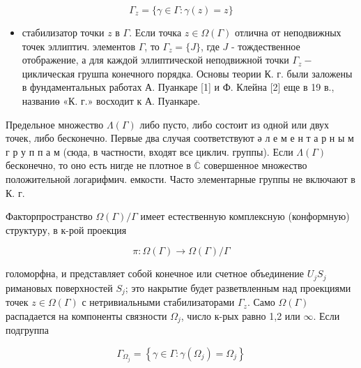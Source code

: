 \documentclass[10pt]{article}
\begin{document}
\[

\Gamma_{z}=\{\gamma \in \Gamma: \gamma(z)=z\}

\]



\begin{itemize}

  \item стабилизатор точки $z$ в $\Gamma$. Если точка $z \in \Omega(\Gamma)$ отлична от неподвижных точек эллиптич. элементов $\Gamma$, то $\Gamma_{z}=\{J\}$, где $J$ - тождественное отображение, а для каждой эллиптической неподвижной точки $\Gamma_{z}-$ циклическая грушпа конечного порядка. Основы теории К. г. были заложены в фундаментальных работах А. Пуанкаре [1] и Ф. Клейна [2] еще в 19 в., названиө «К. г.» восходит к А. Пуанкаре.

\end{itemize}



Предельное множество $\Lambda(\Gamma)$ либо пусто, либо состоит из одной или двух точек, либо бесконечно. Первые два случая соответствуют ә л е м е н т а р н ы м г р у п п а м (сюда, в частности, входят все циклич. группы). Если $\Lambda(\Gamma)$ бесконечно, то оно есть нигде не плотное в $\overline{\mathbb{C}}$ совершенное множество положительной логарифмич. емкости. Часто элементарные группы не включают в К. г.



Факторпространство $\Omega(\Gamma) / \Gamma$ имеет естественную комплексную (конформную) структуру, в к-рой проекция



\[

\pi: \Omega(\Gamma) \rightarrow \Omega(\Gamma) / \Gamma

\]



голоморфна, и представляет собой конечное или счетное объединение $U_{j} S_{j}$ римановых поверхностей $S_{j}$; это накрытие будет разветвленным над проекциями точек $z \in \Omega(\Gamma)$ с нетривиальными стабилизаторами $\Gamma_{z}$. Само $\Omega(\Gamma)$ распадается на компоненты связности $\Omega_{j}$, число к-рых равно 1,2 или $\infty$. Если подгруппа



\[

\Gamma_{\Omega_{j}}=\left\{\gamma \in \Gamma: \gamma\left(\Omega_{j}\right)=\Omega_{j}\right\}

\]
\end{document}
